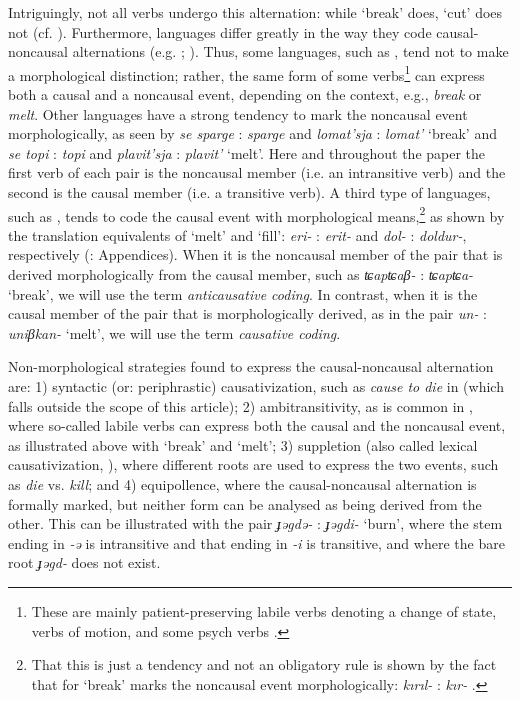 \documentclass[output=paper,colorlinks,citecolor=brown]{langscibook}
\begin{document}
Intriguingly, not all verbs undergo this alternation: while ‘break’ does, ‘cut’ does not (cf. \citealt[653]{Schäfer2009}). Furthermore, languages differ greatly in the way they code causal-noncausal alternations (e.g. \citealt{Haspelmath1993}; \citealt{Nichols2004}). Thus, some languages, such as , tend not to make a morphological distinction; rather, the same form of some verbs\footnote{These are mainly patient-preserving labile verbs denoting a change of state, verbs of motion, and some psych verbs \citep[181--182]{Zúñiga2019}.} can express both a causal and a noncausal event, depending on the context, e.g.,  \textit{break} or \textit{melt}. Other languages have a strong tendency to mark the noncausal event morphologically, as seen by  \textit{se sparge} : \textit{sparge} and  \textit{lomat’sja} : \textit{lomat’} ‘break’ and  \textit{se topi} : \textit{topi} and  \textit{plavit’sja} : \textit{plavit’} ‘melt’. Here and throughout the paper the first verb of each pair is the noncausal member (i.e. an intransitive verb) and the second is the causal member (i.e. a transitive verb). A third type of languages, such as , tends to code the causal event with morphological means,\footnote{That this is just a tendency and not an obligatory rule is shown by the fact that for ‘break’  marks the noncausal event morphologically: \textit{kırıl-} : \textit{kır-} \citep[Appendix A7]{Haspelmathetal2014}.} as shown by the translation equivalents of ‘melt’ and ‘fill’: \textit{eri-} : \textit{erit-} and \textit{dol-} : \textit{doldur-}, respectively (\citealt{Haspelmathetal2014}: Appendices). When it is the noncausal member of the pair that is derived morphologically from the causal member, such as  \textit{ʨapʨaβ-} : \textit{ʨapʨa-} ‘break’, we will use the term \textit{anticausative coding}. In contrast, when it is the causal member of the pair that is morphologically derived, as in the  pair \textit{un-} : \textit{uniβkan-} ‘melt’, we will use the term \textit{causative coding}.

Non-morphological strategies found to express the causal-noncausal alternation are: 1) syntactic (or: periphrastic) causativization, such as \textit{cause to die} in  (which falls outside the scope of this article); 2) ambitransitivity, as is common in , where so-called labile verbs can express both the causal and the noncausal event, as illustrated above with ‘break’ and ‘melt’; 3) suppletion (also called lexical causativization, \citealt[25]{Zúñiga2019}), where different roots are used to express the two events, such as  \textit{die} vs. \textit{kill}; and 4) equipollence, where the causal-noncausal alternation is formally marked, but neither form can be analysed as being derived from the other. This can be illustrated with the  pair \textit{ɟəgdə-} : \textit{ɟəgdi-} ‘burn’, where the stem ending in \textit{-ə} is intransitive and that ending in \textit{-i} is transitive, and where the bare root \textit{ɟəgd-} does not exist.
\end{document}
